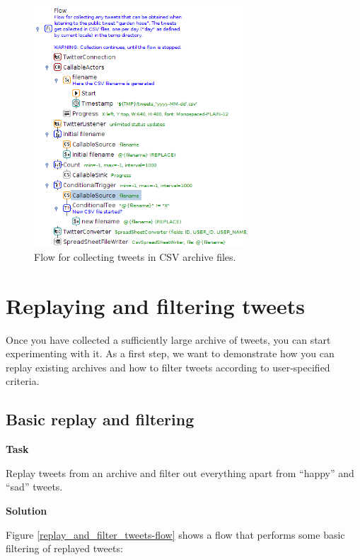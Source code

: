 \documentclass[a4paper,10pt]{book}
\newcommand{\heading}[1]{
  \vspace{0.3cm} \noindent \textbf{#1} \newline
}
\begin{document}
\begin{figure}[htb]
  \centering
  \includegraphics[width=8.0cm]{images/collect_tweets-flow.png}
  \caption{Flow for collecting tweets in CSV archive files.}
  \label{collect_tweets-flow}
\end{figure}

\clearpage
\newpage
\section{Replaying and filtering tweets}
Once you have collected a sufficiently large archive of tweets, you can start experimenting with it. As a first step, we want to demonstrate how you can replay existing archives and how to filter tweets according to user-specified criteria.

\subsection{Basic replay and filtering}

\heading{Task}
Replay tweets from an archive and filter out everything apart from ``happy'' and ``sad'' tweets.

\heading{Solution}
Figure \ref{replay_and_filter_tweets-flow} shows a flow that performs some basic filtering of replayed tweets:
\end{document}
